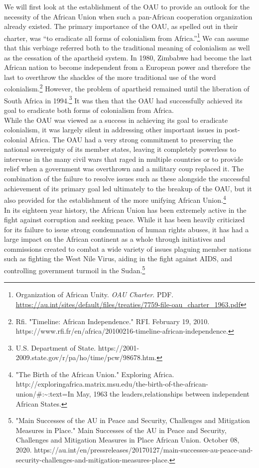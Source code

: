 \documentclass[10pt, letterpaper]{article}
\begin{document}
We will first look at the establishment of the OAU to provide an outlook
for the necessity of the African Union when such a pan-African
cooperation organization already existed. The primary importance of the
OAU, as spelled out in their charter, was ``to eradicate all forms of
colonialism from Africa.''\footnote{Organization of African Unity.
  \emph{OAU Charter}. PDF.
  \href{https://au.int/sites/default/files/treaties/7759-file-oau_charter_1963.pdf}{\underline{https://au.int/sites/default/files/treaties/7759-file-oau\_charter\_1963.pdf}}}
We can assume that this verbiage referred both to the traditional
meaning of colonialism as well as the cessation of the apartheid system.
In 1980, Zimbabwe had become the last African nation to become
independent from a European power and therefore the last to overthrow
the shackles of the more traditional use of the word
colonialism.\footnote{Rfi. "Timeline: African Independence." RFI.
  February 19, 2010.
  https://www.rfi.fr/en/africa/20100216-timeline-african-independence.}
However, the problem of apartheid remained until the liberation of South
Africa in 1994.\footnote{U.S. Department of State.
  https://2001-2009.state.gov/r/pa/ho/time/pcw/98678.htm.} It was then
that the OAU had successfully achieved its goal to eradicate both forms
of colonialism from Africa. \\

While the OAU was viewed as a success in achieving its goal to eradicate
colonialism, it was largely silent in addressing other important issues
in post-colonial Africa. The OAU had a very strong commitment to
preserving the national sovereignty of its member states, leaving it
completely powerless to intervene in the many civil wars that raged in
multiple countries or to provide relief when a government was overthrown
and a military coup replaced it. The combination of the failure to
resolve issues such as these alongside the successful achievement of its
primary goal led ultimately to the breakup of the OAU, but it also
provided for the establishment of the more unifying African
Union.\footnote{"The Birth of the African Union." Exploring Africa.
  http://exploringafrica.matrix.msu.edu/the-birth-of-the-african-union/\#:\textasciitilde:text=In
  May, 1963 the leaders,relationships between independent African
  States.} \\

In its eighteen year history, the African Union has been extremely
active in the fight against corruption and seeking peace. While it has
been heavily criticized for its failure to issue strong condemnation of
human rights abuses, it has had a large impact on the African continent
as a whole through initiatives and commissions created to combat a wide
variety of issues plaguing member nations such as fighting the West Nile
Virus, aiding in the fight against AIDS, and controlling government
turmoil in the Sudan.\footnote{"Main Successes of the AU in Peace and
  Security, Challenges and Mitigation Measures in Place." Main Successes
  of the AU in Peace and Security, Challenges and Mitigation Measures in
  Place \textbar{} African Union. October 08, 2020.
  https://au.int/en/pressreleases/20170127/main-successes-au-peace-and-security-challenges-and-mitigation-measures-place.} \\
\end{document}
